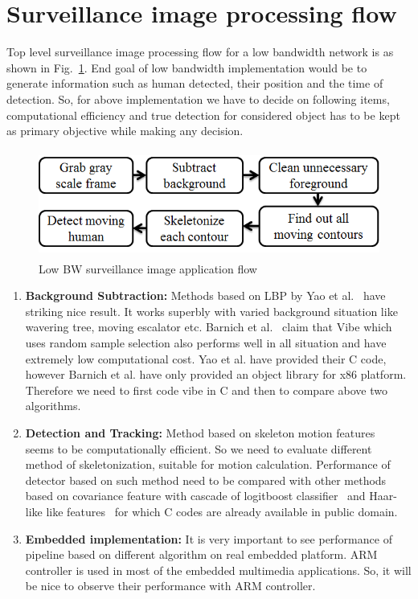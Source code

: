 \section{Surveillance image processing flow}
\indent Top level surveillance image processing flow for a low bandwidth
network is as shown in Fig.~\ref{image_pipeline}. End goal of low
bandwidth implementation would be to generate information such as human
detected, their position and the time of detection. So, for above
implementation we have to decide on following items, computational
efficiency and true detection for considered object has to be kept as
primary objective while making any decision.

\begin{figure}[!b]
\centering
\includegraphics[height=100pt]{Figures/image_pipeline}
\caption{Low BW surveillance image application flow}
\label{image_pipeline}
\end{figure}
\begin{enumerate}
\item \textbf{Background Subtraction:} Methods based on LBP by Yao et
	al.~\cite{11} have striking nice result. It works superbly with
	varied background situation like wavering tree, moving escalator
	etc. Barnich et al.~\cite{9} claim that Vibe which uses random
	sample selection also performs well in all situation and have
	extremely low computational cost. Yao et al. have provided their
	C code, however Barnich et al.  have only provided an object
	library for x86 platform. Therefore we need to first code vibe
	in C and then to compare above two algorithms.
\item \textbf{Detection and Tracking:} Method based on skeleton motion
	features~\cite{32, 22, 31} seems to be computationally
	efficient. So we need to evaluate different method of
	skeletonization, suitable for motion calculation. Performance of
	detector based on such method need to be compared with other
	methods based on covariance feature with cascade of logitboost
	classifier~\cite{19}  and Haar-like like features~\cite{17} for
	which C codes are already available in public domain.
\item \textbf{Embedded implementation:} It is very important to see
	performance of pipeline based on different algorithm on real
	embedded platform. ARM controller is used in most of the
	embedded multimedia applications. So, it will be nice to observe
	their performance with ARM controller.
\end{enumerate}
